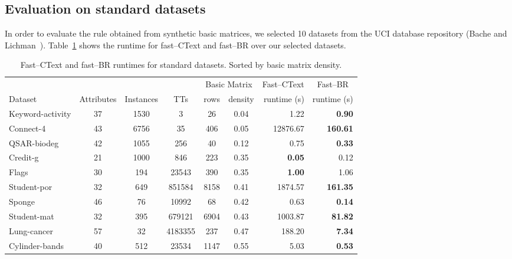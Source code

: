 \documentclass[citeauthoryear]{llncs}
\begin{document}
\subsection{Evaluation on standard datasets}
	In order to evaluate the rule obtained from synthetic basic matrices, we selected 10 datasets from the UCI database repository (Bache and Lichman~\cite{Bache13}). Table~\ref{tab:density} shows the runtime for fast--CText and fast--BR over our selected datasets.
	
	\begin{table}[htb]
		\centering \footnotesize
		\caption{Fast--CText and fast--BR runtimes for standard datasets. Sorted by basic matrix density.}
		\label{tab:density}
		\begin{tabular}{lcccccrr}
			\hline
			&&&& \multicolumn{2}{c}{Basic Matrix} &  \multicolumn{1}{c}{Fast--CText} & \multicolumn{1}{c}{Fast--BR} \\
			\cline{5-6}
			Dataset   		 & Attributes & Instances & TTs     & rows  & density & runtime (s) & runtime (s) \\
			\hline
			Keyword-activity & 37         & 1530      & 3        & 26    & 0.04    & 1.22             & \textbf{0.90}   \\
			Connect-4        & 43         & 6756      & 35       & 406   & 0.05    & 12876.67         & \textbf{160.61} \\
			QSAR-biodeg      & 42         & 1055      & 256      & 40    & 0.12    & 0.75             & \textbf{0.33}   \\
			Credit-g         & 21         & 1000      & 846      & 223   & 0.35    & \textbf{0.05}    & 0.12            \\
			Flags            & 30         & 194       & 23543    & 390   & 0.35    & \textbf{1.00}    & 1.06            \\
			Student-por      & 32         & 649       & 851584   & 8158  & 0.41    & 1874.57          & \textbf{161.35} \\
			Sponge           & 46         & 76        & 10992    & 68    & 0.42    & 0.63             & \textbf{0.14}   \\
			Student-mat      & 32         & 395       & 679121   & 6904  & 0.43    & 1003.87          & \textbf{81.82}  \\
			Lung-cancer      & 57         & 32        & 4183355  & 237   & 0.47    & 188.20           & \textbf{7.34}   \\
			Cylinder-bands   & 40         & 512       & 23534    & 1147  & 0.55    & 5.03             & \textbf{0.53}   \\
			\hline
		\end{tabular}
	\end{table}
	
\end{document}
